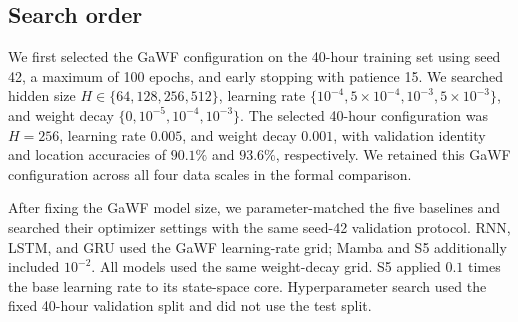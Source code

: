 \subsection{Search order}

We first selected the GaWF configuration on the 40-hour training set using seed 42, a maximum of 100 epochs, and early stopping with patience 15. We searched hidden size \(H\in\{64,128,256,512\}\), learning rate \(\{10^{-4},5\times10^{-4},10^{-3},5\times10^{-3}\}\), and weight decay \(\{0,10^{-5},10^{-4},10^{-3}\}\). The selected 40-hour configuration was \(H=256\), learning rate \(0.005\), and weight decay \(0.001\), with validation identity and location accuracies of \(90.1\%\) and \(93.6\%\), respectively. We retained this GaWF configuration across all four data scales in the formal comparison.

\begin{table}[t]
\centering
\caption{GaWF hyperparameter selection on the 40-hour training set. The reported validation accuracies are from the selected seed-42 run.}
\label{tab:gawf-search}
\end{table}

After fixing the GaWF model size, we parameter-matched the five baselines and searched their optimizer settings with the same seed-42 validation protocol. RNN, LSTM, and GRU used the GaWF learning-rate grid; Mamba and S5 additionally included \(10^{-2}\). All models used the same weight-decay grid. S5 applied \(0.1\) times the base learning rate to its state-space core. Hyperparameter search used the fixed 40-hour validation split and did not use the test split.

